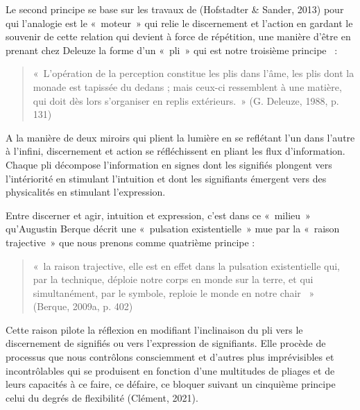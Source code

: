 \documentclass[
  a4paper,
  DIV=11,
  numbers=noendperiod]{scrreprt}
\begin{document}
Le second principe se base sur les travaux de (Hofstadter \& Sander,
2013) pour qui l'analogie est le «~moteur~» qui relie le discernement et
l'action en gardant le souvenir de cette relation qui devient à force de
répétition, une manière d'être en prenant chez Deleuze la forme d'un
«~pli~» qui est notre troisième principe ~:

\begin{quote}
«~L'opération de la perception constitue les plis dans l'âme, les plis
dont la monade est tapissée du dedans ; mais ceux-ci ressemblent à une
matière, qui doit dès lors s'organiser en replis extérieurs.~» (G.
Deleuze, 1988, p. 131)
\end{quote}

A la manière de deux miroirs qui plient la lumière en se reflétant l'un
dans l'autre à l'infini, discernement et action se réfléchissent en
pliant les flux d'information. Chaque pli décompose l'information en
signes dont les signifiés plongent vers l'intériorité en stimulant
l'intuition et dont les signifiants émergent vers des physicalités en
stimulant l'expression.

Entre discerner et agir, intuition et expression, c'est dans ce
«~milieu~» qu'Augustin Berque décrit une «~pulsation existentielle~» mue
par la «~raison trajective~» que nous prenons comme quatrième principe :

\begin{quote}
«~la raison trajective, elle est en effet dans la pulsation
existentielle qui, par la technique, déploie notre corps en monde sur la
terre, et qui simultanément, par le symbole, reploie le monde en notre
chair ~»~ (Berque, 2009a, p. 402)
\end{quote}

Cette raison pilote la réflexion en modifiant l'inclinaison du pli vers
le discernement de signifiés ou vers l'expression de signifiants. Elle
procède de processus que nous contrôlons consciemment et d'autres plus
imprévisibles et incontrôlables qui se produisent en fonction d'une
multitudes de pliages et de leurs capacités à ce faire, ce défaire, ce
bloquer suivant un cinquième principe celui du degrés de flexibilité
(Clément, 2021).
\end{document}
